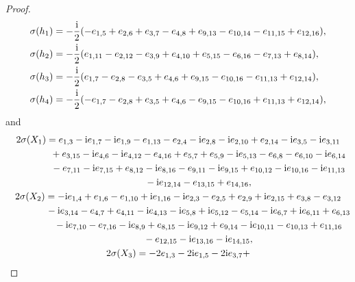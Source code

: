 \documentclass[pdftex]{sigma}
\numberwithin{equation}{section}
\begin{document}
\begin{proof}
			\begin{align*}
				\sigma(h_1) &= -\frac{{\rm i}}{2}( -e_{1, 5} + e_{2, 6} + e_{3, 7} -
				e_{4, 8} + e_{9, 13} - e_{10, 14} - e_{11, 15} +
				e_{12, 16}) , \\
				\sigma(h_2) &= -\frac{{\rm i}}{2}( e_{1, 11} - e_{2, 12} - e_{3, 9} +
				e_{4, 10} + e_{5, 15} - e_{6, 16} - e_{7, 13} +
				e_{8, 14}) , \\
				\sigma(h_3) &=-\frac{{\rm i}}{2}( e_{1, 7} - e_{2, 8} - e_{3, 5} + e_{4, 6} +
				e_{9, 15} - e_{10, 16} - e_{11, 13} + e_{12, 14} ), \\
				\sigma(h_4) &=-\frac{{\rm i}}{2}( -e_{1, 7} - e_{2, 8} + e_{3, 5} +
				e_{4, 6} - e_{9, 15} - e_{10, 16} + e_{11, 13} +
				e_{12, 14}),
			\end{align*}
			and
			\begin{gather*}
				2\sigma(X_{1})= e_{1, 3} - {\rm i} e_{1, 7} - {\rm i} e_{1, 9} -
				e_{1, 13} - e_{2, 4} - {\rm i} e_{2, 8} -
				{\rm i} e_{2, 10} + e_{2, 14} - {\rm i} e_{3, 5} -
				{\rm i} e_{3, 11} \\
\phantom{2\sigma(X_{1})= }{} + e_{3, 15} - {\rm i} e_{4, 6} -
				{\rm i} e_{4, 12} - e_{4, 16} + e_{5, 7} +
				e_{5, 9} - {\rm i} e_{5, 13} - e_{6, 8} -
				e_{6, 10} - {\rm i} e_{6, 14} \\
\phantom{2\sigma(X_{1})= }{} - e_{7, 11} -
				{\rm i} e_{7, 15} + e_{8, 12} - {\rm i} e_{8, 16} -
				e_{9, 11} - {\rm i} e_{9, 15} + e_{10, 12} -
				{\rm i} e_{10, 16} - {\rm i} e_{11, 13} \\
\phantom{2\sigma(X_{1})= }{} - {\rm i} e_{12, 14} -
				e_{13, 15} + e_{14, 16} , \\
				2\sigma(X_{2}) = -{\rm i} e_{1, 4} + e_{1, 6} - e_{1, 10} +
				{\rm i} e_{1, 16} - {\rm i} e_{2, 3} - e_{2, 5} +
				e_{2, 9} + {\rm i} e_{2, 15} + e_{3, 8} -
				e_{3, 12} \\
\phantom{2\sigma(X_{2}) = }{}- {\rm i} e_{3, 14} - e_{4, 7} +
				e_{4, 11} - {\rm i} e_{4, 13} - {\rm i} e_{5, 8} +
				{\rm i} e_{5, 12} - e_{5, 14} - {\rm i} e_{6, 7} +
				{\rm i} e_{6, 11} + e_{6, 13} \\
\phantom{2\sigma(X_{2}) = }{}- {\rm i} e_{7, 10} -
				e_{7, 16} - {\rm i} e_{8, 9} + e_{8, 15} -
				{\rm i} e_{9, 12} + e_{9, 14} - {\rm i} e_{10, 11} -
				e_{10, 13} + e_{11, 16} \\
\phantom{2\sigma(X_{2}) = }{} - e_{12, 15} -
				{\rm i} e_{13, 16} - {\rm i} e_{14, 15} ,\\
				2\sigma(X_{3}) = -2 e_{1, 3} - 2 {\rm i} e_{1, 5} - 2 {\rm i} e_{3, 7} +

\end{gather*}
\end{proof}
\end{document}
